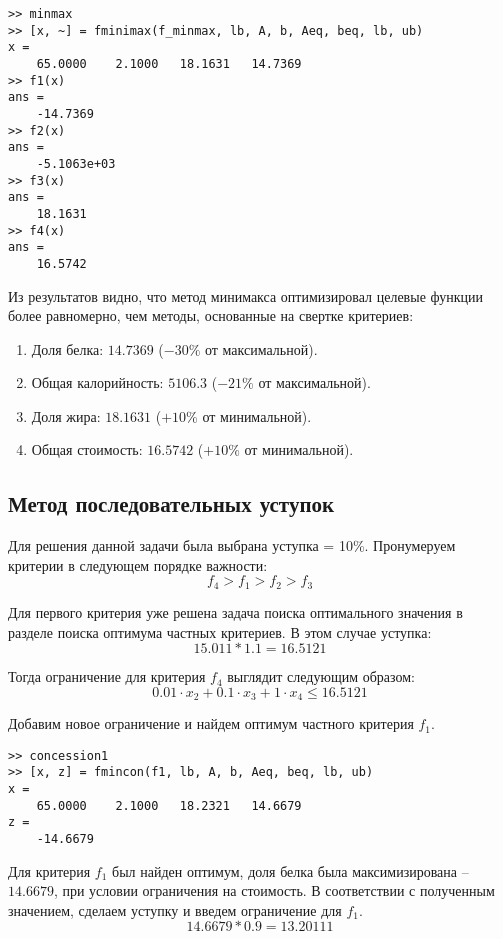 \begin{lstlisting}[caption=\code{Console}]
>> minmax
>> [x, ~] = fminimax(f_minmax, lb, A, b, Aeq, beq, lb, ub)
x =
	65.0000    2.1000   18.1631   14.7369
>> f1(x)
ans =
	-14.7369
>> f2(x)
ans =
	-5.1063e+03
>> f3(x)
ans =
	18.1631
>> f4(x)
ans =
	16.5742
\end{lstlisting}

Из результатов видно, что метод минимакса оптимизировал целевые функции более равномерно, чем методы, основанные на свертке критериев:

\begin{enumerate}
	\item Доля белка: $14.7369$ ($-30\%$ от максимальной).
	\item Общая калорийность: $5106.3$ ($-21\%$ от максимальной).
	\item Доля жира: $18.1631$ ($+10\%$ от минимальной).
	\item Общая стоимость: $16.5742$ ($+10\%$ от минимальной).
\end{enumerate}

\subsection{Метод последовательных уступок}

Для решения данной задачи была выбрана уступка = 10\%. Пронумеруем критерии в следующем порядке важности:
$$
f_4 > f_1 > f_2 > f_3
$$

Для первого критерия уже решена задача поиска оптимального значения в разделе поиска оптимума частных критериев. В этом случае уступка:
$$
15.011 * 1.1 = 16.5121
$$

Тогда ограничение для критерия $f_4$ выглядит следующим образом:
$$
0.01 \cdot x_2 + 0.1 \cdot x_3 + 1 \cdot x_4 \leq 16.5121
$$

Добавим новое ограничение и найдем оптимум частного критерия $f_1$.



\begin{lstlisting}[caption=\code{Console}]
>> concession1
>> [x, z] = fmincon(f1, lb, A, b, Aeq, beq, lb, ub)
x =
	65.0000    2.1000   18.2321   14.6679
z =
	-14.6679
\end{lstlisting}

Для критерия $f_1$ был найден оптимум, доля белка была максимизирована -- $14.6679$, при условии ограничения на стоимость. В соответствии с полученным значением, сделаем уступку и введем ограничение для $f_1$.
$$
14.6679 * 0.9 = 13.20111
$$

